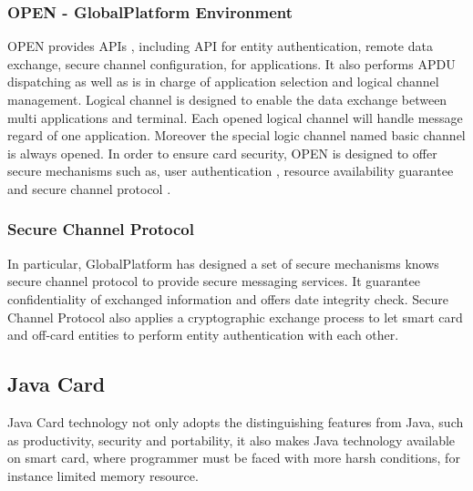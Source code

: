\documentclass[]{llncs}
\begin{document}
\subsubsection{OPEN - GlobalPlatform Environment}
OPEN provides APIs , including API for entity authentication, remote data exchange, secure channel configuration, for applications. It also performs APDU dispatching as well as is in charge of application selection and logical channel management\cite{gp}. Logical channel is designed to enable the data exchange between multi applications and terminal. Each opened logical channel will handle message regard of one application.  Moreover the special logic channel named basic channel is always opened. In order to ensure  card security, OPEN is designed to offer secure mechanisms such as,  user authentication , resource availability guarantee and secure channel protocol .
\subsubsection{Secure Channel Protocol}
In particular, GlobalPlatform has designed a set of secure mechanisms knows secure channel  protocol to provide secure messaging services. It guarantee confidentiality of exchanged information and offers date integrity check. Secure Channel Protocol also applies a cryptographic exchange process to let smart card and  off-card entities to perform entity authentication with each other. 

\subsection{Java Card}
Java Card technology not only adopts the distinguishing features from Java, such as productivity, security and portability\cite{jcadg}, it also makes Java technology available on smart card, where programmer must be faced with more harsh conditions, for instance limited memory resource.
\end{document}
